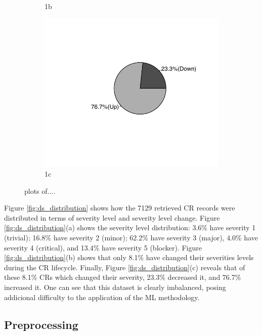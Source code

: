 \documentclass[10pt, conference]{IEEEtran}
\begin{document}
\begin{figure}[!hbt]
\begin{subfigure}{.5\textwidth}
  \caption{1b}
  \label{fig:sfig2}
\end{subfigure}
\begin{subfigure}{.5\textwidth}
  \centering
  \includegraphics{figures/ds_distribution_3.pdf}
  \caption{1c}
  \label{fig:sfig3}
\end{subfigure}

\caption{plots of....}
\label{fig:fig}
\end{figure}

Figure \ref{fig:ds_distribution} shows how the 7129 retrieved CR records were distributed in terms of severity level and severity level change. Figure \ref{fig:ds_distribution}(a) shows the severity level distribution: 3.6\% have severity 1 (trivial); 16.8\% have severity 2 (minor); 62.2\% have severity 3 (major), 4.0\% have severity 4 (critical), and 13.4\% have severity 5 (blocker). Figure \ref{fig:ds_distribution}(b) shows that only 8.1\% have changed their severities levels during the CR lifecycle. Finally, Figure \ref{fig:ds_distribution}(c) reveals that of these 8.1\% CRs which changed their severity, 23.3\% decreased it, and 76.7\% increased it. One can see that this dataset is clearly imbalanced, posing addicional difficulty to the application of the ML methodology. 

\subsection{Preprocessing} 	\label{subsec:preprocessing}
\end{document}
